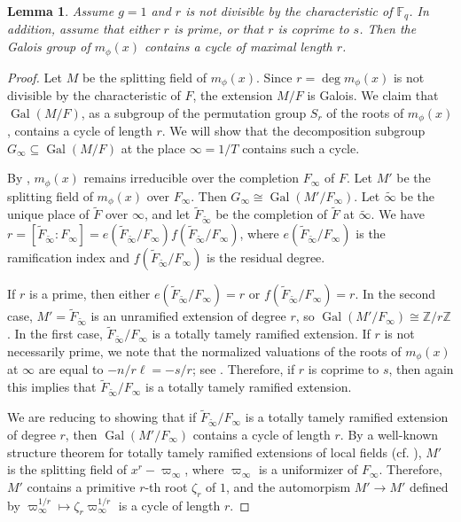 \documentclass[12pt]{amsart}
\newtheorem{lem}[thm]{Lemma}
\theoremstyle{definition}
\theoremstyle{remark}
\numberwithin{equation}{section}
\numberwithin{thm}{section}
\DeclareMathOperator{\Gal}{Gal}
\newcommand{\F}{\mathbb{F}}
\newcommand{\Z}{\mathbb{Z}}
\newcommand{\tF}{\widetilde{F}}
\newcommand{\tinf}{\widetilde{\infty}}
\newcommand{\Fi}{F_\infty}
\begin{document}
\begin{lem} Assume $g=1$ and $r$ is not divisible by the characteristic of $\F_q$. In addition, assume that either $r$ is prime, or 
that $r$ is coprime to $s$. Then the Galois group of $m_\phi(x)$ contains a cycle of maximal length $r$. 
\end{lem}
\begin{proof}
	Let $M$ be the splitting field of $m_\phi(x)$. Since $r=\deg m_\phi(x)$ is not divisible by the characteristic of $F$, the extension $M/F$ is Galois. 
	We claim that $\Gal(M/F)$, as a subgroup of the permutation group $S_r$ of the roots of $m_\phi(x)$, contains a cycle of length $r$. 
	We will show that the decomposition subgroup $G_\infty\subseteq \Gal(M/F)$ at the place $\infty=1/T$ contains such a cycle. 
	
	By \cite[Thm. 4.1.3]{PapikianGTM}, $m_\phi(x)$ remains irreducible over the completion $\Fi$ of $F$. Let 
	$M'$ be the splitting field of $m_\phi(x)$ over $\Fi$. Then $G_\infty\cong \Gal(M'/\Fi)$. 
	Let $\tinf$ be the unique place of $\tF$ over $\infty$, and let $\tF_{\tinf}$ be the completion of $\tF$ at $\tinf$. We have 
	$r=[\tF_{\tinf}:\Fi]=e(\tF_{\tinf}/\Fi) f(\tF_{\tinf}/\Fi)$, where $e(\tF_{\tinf}/\Fi) $ is the ramification index and $f(\tF_{\tinf}/\Fi)$ 
	is the residual degree. 
	
	If $r$ is a prime, then either  $e(\tF_{\tinf}/\Fi)=r$ or $f(\tF_{\tinf}/\Fi)=r$. In the second case, $M'=\tF_{\tinf}$ is an unramified extension of degree $r$, so $\Gal(M'/\Fi)\cong \Z/r\Z$. In the first case, $\tF_{\tinf}/\Fi$ is a totally tamely ramified extension. 
	If $r$ is not necessarily prime, we note that the  normalized 
	valuations of the roots of $m_\phi(x)$ at $\infty$ are equal to $-n/r\ell=-s/r$; see \cite[Thm. 4.2.7]{PapikianGTM}. 
	Therefore, if $r$ is coprime to $s$, then again this implies that $\tF_{\tinf}/\Fi$ is a totally tamely ramified extension. 
	
	We are reducing to showing that if $\tF_{\tinf}/\Fi$ is a totally tamely ramified extension of degree $r$, 
	then $\Gal(M'/\Fi)$ contains a cycle of length $r$. By a well-known structure theorem for totally tamely ramified extensions 
	of local fields (cf. \cite[Prop. 2.6.7]{PapikianGTM}), $M'$ is the splitting field of $x^r-\varpi_\infty$, where $\varpi_\infty$ 
	is a uniformizer of $\Fi$. Therefore, $M'$ contains a primitive $r$-th root $\zeta_r$ of $1$, and the automorpism $M'\to M'$ defined by 
	$\varpi_\infty^{1/r}\mapsto \zeta_r\varpi_\infty^{1/r}$ is a cycle of length $r$. 
\end{proof}
\end{document}
